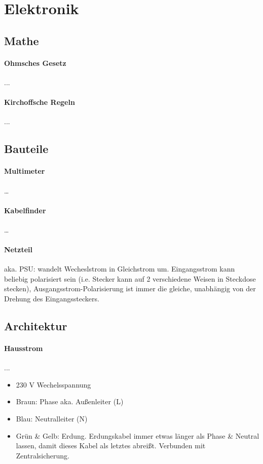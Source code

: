 \section{Elektronik}

\subsection{Mathe}
\paragraph{Ohmsches Gesetz} ...
\paragraph{Kirchoffsche Regeln} ...

\subsection{Bauteile}
\paragraph{Multimeter}\dots
\paragraph{Kabelfinder} \dots
\paragraph{Netzteil} aka. PSU: wandelt Wecheslstrom in Gleichstrom um. Eingangsstrom kann beliebig polarisiert sein (i.e. Stecker kann auf 2 verschiedene Weisen in Steckdose stecken), Ausgangsstrom-Polarisierung ist immer die gleiche, unabhängig von der Drehung des Eingangssteckers.

\subsection{Architektur}

\paragraph{Hausstrom}...
\begin{itemize}
    \item 230 V Wechelsspannung
    \item Braun: Phase aka. Außenleiter (L)
    \item Blau: Neutralleiter (N)
    \item Grün & Gelb: Erdung. Erdungskabel immer etwas länger als Phase & Neutral lassen, damit dieses Kabel als letztes abreißt. Verbunden mit Zentralsicherung.
\end{itemize}


